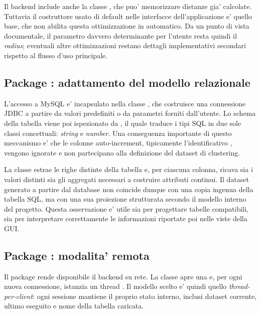 Il backend include anche la classe , che puo' memorizzare distanze
gia' calcolate. Tuttavia il costruttore usato di default nelle interfacce
dell'applicazione e' quello base, che non abilita questa ottimizzazione in automatico. Da
un punto di vista documentale, il parametro davvero determinante per l'utente resta
quindi il \emph{radius}; eventuali altre ottimizzazioni restano dettagli implementativi
secondari rispetto al flusso d'uso principale.

\subsection{Package : adattamento del modello relazionale}

L'accesso a MySQL e' incapsulato nella classe , che costruisce una
connessione JDBC a partire da valori predefiniti o da parametri forniti dall'utente. Lo
schema della tabella viene poi ispezionato da , il quale traduce i
tipi SQL in due sole classi concettuali: \emph{string} e \emph{number}. Una conseguenza
importante di questo meccanismo e' che le colonne auto-increment, tipicamente
l'identificativo , vengono ignorate e non partecipano alla definizione del
dataset di clustering.

La classe  estrae le righe distinte della tabella e, per ciascuna
colonna, ricava sia i valori distinti sia gli aggregati necessari a costruire attributi
continui. Il dataset generato a partire dal database non coincide dunque con una copia
ingenua della tabella SQL, ma con una sua proiezione strutturata secondo il modello
interno del progetto. Questa osservazione e' utile sia per progettare tabelle
compatibili, sia per interpretare correttamente le informazioni riportate poi nelle viste della GUI.

\subsection{Package : modalita' remota}

Il package  rende disponibile il backend su rete. La classe
 apre una  e, per ogni nuova connessione,
istanzia un thread . Il modello scelto e' quindi quello
\emph{thread-per-client}: ogni sessione mantiene il proprio stato interno, inclusi
dataset corrente, ultimo  eseguito e nome della tabella caricata.

